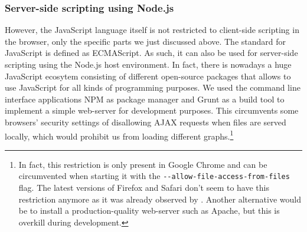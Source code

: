 \subsubsection{Server-side scripting using Node.js}
However, the JavaScript language itself is not restricted to client-side scripting in the  browser, only the specific parts we just discussed above. The standard for JavaScript is defined as ECMAScript. As such, it can also be used for server-side scripting using the Node.js host environment. In fact, there is nowadays a huge JavaScript ecosytem consisting of different open-source packages that allows to use JavaScript for all kinds of programming purposes. We used the command line interface applications NPM as package manager and Grunt as a build tool to implement a simple web-server for development purposes. This circumvents some browsers' security settings of disallowing AJAX requests when files are served locally, which would prohibit us from loading different graphs.\footnote{In fact, this restriction is only present in Google Chrome and can be circumvented when starting it with the \texttt{-{}-allow-file-access-from-files} flag. The latest versions of Firefox and Safari don't seem to have this restriction anymore as it was already observed by \cite{feil2016idp}. Another alternative would be to install a production-quality web-server such as Apache, but this is overkill during development.}

